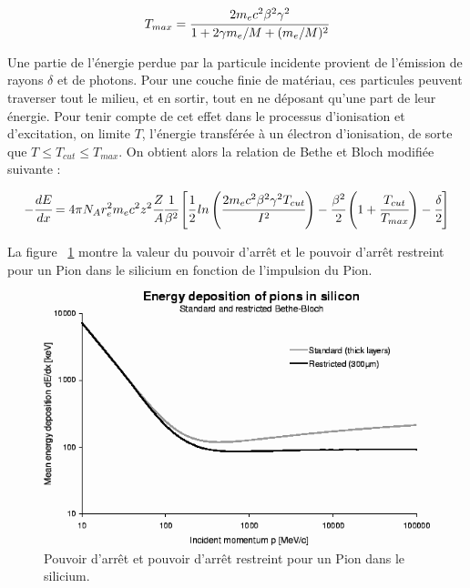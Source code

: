     \[ T_{max} = \cfrac{2 m_e c^2 \beta^2 \gamma^2}{1 + 2 \gamma m_e/M + (m_e/M)^2} \]

   Une partie de l'\'energie perdue par la particule incidente provient de l'\'emission de rayons $\delta$ et de photons. Pour une couche finie de mat\'eriau, ces particules peuvent traverser tout le milieu, et en sortir, tout en ne d\'eposant qu'une part de leur \'energie. Pour tenir compte de cet effet dans le processus d'ionisation et d'excitation, on limite $T$, l'\'energie transf\'er\'ee \`a un \'electron d'ionisation, de sorte que $T \leq T_{cut} \leq T_{max}$. On obtient alors la relation de Bethe et Bloch modifi\'ee suivante :
   
   \[ -\cfrac{dE}{dx} = 4 \pi N_A r_e^2 m_e c^2 z^2 \cfrac{Z}{A} \cfrac{1}{\beta^2} \left[ \cfrac{1}{2} \, ln\left( \cfrac{2 m_e c^2 \beta^2 \gamma^2 T_{cut} }{I^2} \right) - \cfrac{ \beta^2 }{2} \left( 1 + \cfrac{T_{cut}}{T_{max}} \right) -\cfrac{\delta}{2} \right]  \]

   La figure ~\ref{fig:restricted_Bethe_Bloch} montre la valeur du pouvoir d'arrêt et le pouvoir d'arrêt restreint pour un Pion dans le silicium en fonction de l'impulsion du Pion.

   \begin{figure}[!htb]
    \begin{center} 
     \includegraphics[scale=0.50]{./figures/restricted_Bethe_Bloch.png}
     \caption{Pouvoir d'arrêt et pouvoir d'arrêt restreint pour un Pion dans le silicium.}
     \label{fig:restricted_Bethe_Bloch}
    \end{center}
   \end{figure}   
   
   \medskip
   
